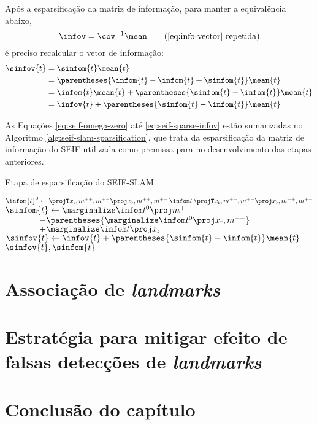 Após a esparsificação da matriz de informação, para manter a equivalência abaixo,
\begin{equation*}
  \ifcorrespondence \tag{\ref{eq:info-vector} repetida}
\end{equation*}
é preciso recalcular o vetor de informação:
\begin{equation}
\begin{aligned}
  \sinfov{t} &= \sinfom{t} \mean{t}\\
  &= \parentheses{\infom{t} - \infom{t} + \sinfom{t}} \mean{t}\\
  &= \infom{t}\mean{t} + \parentheses{\sinfom{t} - \infom{t}}\mean{t}\\
  &= \infov{t} + \parentheses{\sinfom{t} - \infom{t}}\mean{t}\\
\end{aligned}
\label{eq:seif-sparse-infov}
\end{equation}

As Equações \ref{eq:seif-omega-zero} até \ref{eq:seif-sparse-infov} 
estão sumarizadas no Algoritmo \ref{alg:seif-slam-sparsification}, que 
trata da esparsificação da matriz de informação do SEIF utilizada 
como premissa para no desenvolvimento das etapas anteriores.

\begin{algorithm}[h]
  \caption{Etapa de esparsificação do SEIF-SLAM}
  \label{alg:seif-slam-sparsification}
\begin{algorithmic}[1]
  \State {}
  \State $\infom{t}^0 \gets \OmegaZeroValue$
  \State $\sinfom{t} \gets \OmegaOneValue $\\$\qquad \qquad - \parentheses{\OmegaTwoValue}$\\$\qquad\qquad + \OmegaThreeValue$
  \State $\sinfov{t} \gets \infov{t} + \parentheses{\sinfom{t} - \infom{t}}\mean{t}$
  \State \Return $\sinfov{t}, \sinfom{t}$
  \EndProcedure
\end{algorithmic}
\end{algorithm}

\section{Associação de \textit{landmarks}}
\label{sec:data-association}


\section{Estratégia para mitigar efeito de falsas detecções de \textit{landmarks}}


\section{Conclusão do capítulo}
